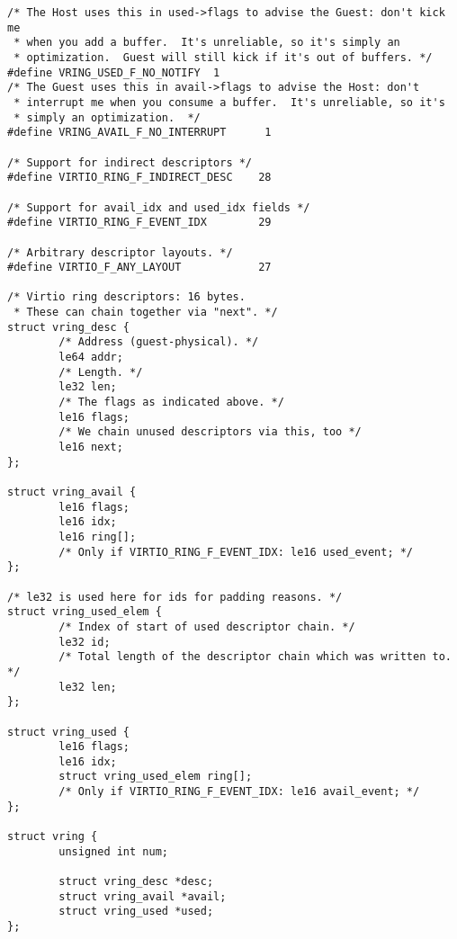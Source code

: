 \begin{lstlisting}
/* The Host uses this in used->flags to advise the Guest: don't kick me
 * when you add a buffer.  It's unreliable, so it's simply an
 * optimization.  Guest will still kick if it's out of buffers. */
#define VRING_USED_F_NO_NOTIFY  1
/* The Guest uses this in avail->flags to advise the Host: don't
 * interrupt me when you consume a buffer.  It's unreliable, so it's
 * simply an optimization.  */
#define VRING_AVAIL_F_NO_INTERRUPT      1

/* Support for indirect descriptors */
#define VIRTIO_RING_F_INDIRECT_DESC    28

/* Support for avail_idx and used_idx fields */
#define VIRTIO_RING_F_EVENT_IDX        29

/* Arbitrary descriptor layouts. */
#define VIRTIO_F_ANY_LAYOUT            27

/* Virtio ring descriptors: 16 bytes.
 * These can chain together via "next". */
struct vring_desc {
        /* Address (guest-physical). */
        le64 addr;
        /* Length. */
        le32 len;
        /* The flags as indicated above. */
        le16 flags;
        /* We chain unused descriptors via this, too */
        le16 next;
};

struct vring_avail {
        le16 flags;
        le16 idx;
        le16 ring[];
        /* Only if VIRTIO_RING_F_EVENT_IDX: le16 used_event; */
};

/* le32 is used here for ids for padding reasons. */
struct vring_used_elem {
        /* Index of start of used descriptor chain. */
        le32 id;
        /* Total length of the descriptor chain which was written to. */
        le32 len;
};

struct vring_used {
        le16 flags;
        le16 idx;
        struct vring_used_elem ring[];
        /* Only if VIRTIO_RING_F_EVENT_IDX: le16 avail_event; */
};

struct vring {
        unsigned int num;

        struct vring_desc *desc;
        struct vring_avail *avail;
        struct vring_used *used;
};


\end{lstlisting}
